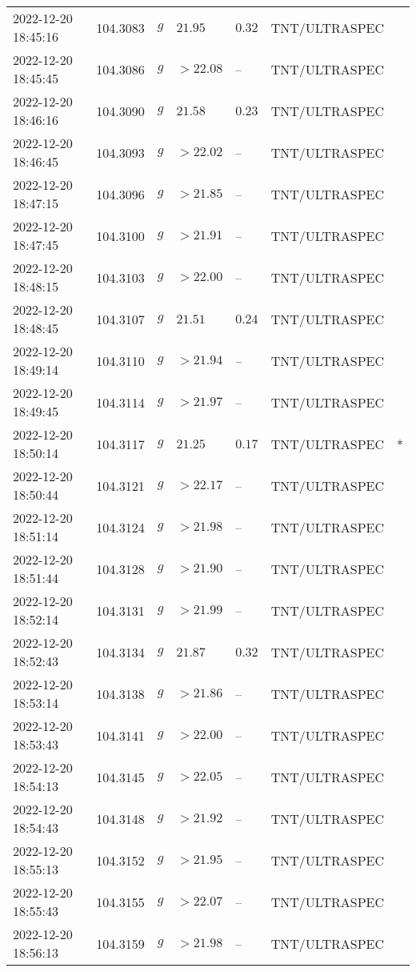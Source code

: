 \documentclass{nature_plusfigure}
\begin{document}
\begin{supplement}
\begin{center}
\begin{longtable}{lllllll}
2022-12-20 18:45:16 & 104.3083 & $g$ & $21.95$ & $0.32$ & TNT/ULTRASPEC &  \\ 
2022-12-20 18:45:45 & 104.3086 & $g$ & $>22.08$ & -- & TNT/ULTRASPEC &  \\ 
2022-12-20 18:46:16 & 104.3090 & $g$ & $21.58$ & $0.23$ & TNT/ULTRASPEC &  \\ 
2022-12-20 18:46:45 & 104.3093 & $g$ & $>22.02$ & -- & TNT/ULTRASPEC &  \\ 
2022-12-20 18:47:15 & 104.3096 & $g$ & $>21.85$ & -- & TNT/ULTRASPEC &  \\ 
2022-12-20 18:47:45 & 104.3100 & $g$ & $>21.91$ & -- & TNT/ULTRASPEC &  \\ 
2022-12-20 18:48:15 & 104.3103 & $g$ & $>22.00$ & -- & TNT/ULTRASPEC &  \\ 
2022-12-20 18:48:45 & 104.3107 & $g$ & $21.51$ & $0.24$ & TNT/ULTRASPEC &  \\ 
2022-12-20 18:49:14 & 104.3110 & $g$ & $>21.94$ & -- & TNT/ULTRASPEC &  \\ 
2022-12-20 18:49:45 & 104.3114 & $g$ & $>21.97$ & -- & TNT/ULTRASPEC &  \\ 
2022-12-20 18:50:14 & 104.3117 & $g$ & $21.25$ & $0.17$ & TNT/ULTRASPEC & * \\ 
2022-12-20 18:50:44 & 104.3121 & $g$ & $>22.17$ & -- & TNT/ULTRASPEC &  \\ 
2022-12-20 18:51:14 & 104.3124 & $g$ & $>21.98$ & -- & TNT/ULTRASPEC &  \\ 
2022-12-20 18:51:44 & 104.3128 & $g$ & $>21.90$ & -- & TNT/ULTRASPEC &  \\ 
2022-12-20 18:52:14 & 104.3131 & $g$ & $>21.99$ & -- & TNT/ULTRASPEC &  \\ 
2022-12-20 18:52:43 & 104.3134 & $g$ & $21.87$ & $0.32$ & TNT/ULTRASPEC &  \\ 
2022-12-20 18:53:14 & 104.3138 & $g$ & $>21.86$ & -- & TNT/ULTRASPEC &  \\ 
2022-12-20 18:53:43 & 104.3141 & $g$ & $>22.00$ & -- & TNT/ULTRASPEC &  \\ 
2022-12-20 18:54:13 & 104.3145 & $g$ & $>22.05$ & -- & TNT/ULTRASPEC &  \\ 
2022-12-20 18:54:43 & 104.3148 & $g$ & $>21.92$ & -- & TNT/ULTRASPEC &  \\ 
2022-12-20 18:55:13 & 104.3152 & $g$ & $>21.95$ & -- & TNT/ULTRASPEC &  \\ 
2022-12-20 18:55:43 & 104.3155 & $g$ & $>22.07$ & -- & TNT/ULTRASPEC &  \\ 
2022-12-20 18:56:13 & 104.3159 & $g$ & $>21.98$ & -- & TNT/ULTRASPEC &  \\ 

\end{longtable}
\end{center}
\end{supplement}
\end{document}
